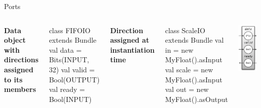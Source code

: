 \documentclass[xcolor=pdflatex,dvipsnames,table]{beamer}
\begin{document}
\begin{frame}[fragile]{Ports}

\begin{columns}

\textbf{Data object with directions assigned to its members}

\begin{scala}
class FIFOIO extends Bundle {
  val data  = Bits(INPUT, 32)
  val valid = Bool(OUTPUT)
  val ready = Bool(INPUT)
}
\end{scala}

\textbf{Direction assigned at instantiation time}

\begin{scala}
class ScaleIO extends Bundle {
  val in    = new MyFloat().asInput
  val scale = new MyFloat().asInput
  val out   = new MyFloat().asOutput
}
\end{scala}


\begin{center}
\includegraphics[height=0.9\textheight]{figs/fifoio.pdf} 
\end{center}

\end{columns}

\end{frame}
\end{document}

